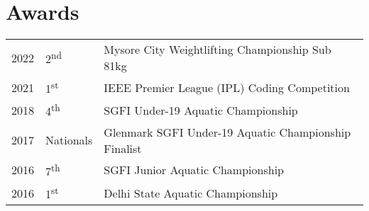 \documentclass[]{deedy-resume-openfont}
\begin{document}
\begin{minipage}[t]{0.66\textwidth}

\section{Awards} 
\begin{tabular}{rll}
2022     & 2\textsuperscript{nd}& Mysore City Weightlifting Championship Sub 81kg\\
2021	     & 1\textsuperscript{st}  & IEEE Premier League (IPL) Coding Competition\\
2018	     & 4\textsuperscript{th}  & SGFI Under-19 Aquatic Championship\\
2017	     & Nationals  & Glenmark SGFI Under-19 Aquatic Championship Finalist\\
2016     & 7\textsuperscript{th} & SGFI Junior Aquatic Championship  \\
2016     & 1\textsuperscript{st} &  Delhi State Aquatic Championship\\
\end{tabular}
\sectionsep



\end{minipage} 
\end{document}
